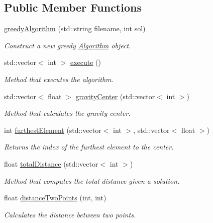 \subsection*{Public Member Functions}
\begin{DoxyCompactItemize}
\item 
\hyperlink{classgreedyAlgorithm_ad2ec161ba440c1a8f35b26823e37ca6b}{greedy\+Algorithm} (std\+::string filename, int sol)
\begin{DoxyCompactList}\small\item\em Construct a new greedy \hyperlink{classAlgorithm}{Algorithm} object. \end{DoxyCompactList}\item 
std\+::vector$<$ int $>$ \hyperlink{classgreedyAlgorithm_a37c81600b24a32ae25b6f0eeab643a7a}{execute} ()
\begin{DoxyCompactList}\small\item\em Method that executes the algorithm. \end{DoxyCompactList}\item 
std\+::vector$<$ float $>$ \hyperlink{classgreedyAlgorithm_a1ba2f9ae707c3d68f0af86ea320f80cf}{gravity\+Center} (std\+::vector$<$ int $>$)
\begin{DoxyCompactList}\small\item\em Method that calculates the gravity center. \end{DoxyCompactList}\item 
int \hyperlink{classgreedyAlgorithm_afb8dddb24fefb88da82011db8c07e17c}{furthest\+Element} (std\+::vector$<$ int $>$, std\+::vector$<$ float $>$)
\begin{DoxyCompactList}\small\item\em Returns the index of the furthest element to the center. \end{DoxyCompactList}\item 
float \hyperlink{classgreedyAlgorithm_a523e81ad05f34731d5259e712b0b6ee5}{total\+Distance} (std\+::vector$<$ int $>$)
\begin{DoxyCompactList}\small\item\em Method that computes the total distance given a solution. \end{DoxyCompactList}\item 
float \hyperlink{classgreedyAlgorithm_a59dd977d1c232276b8494de999e415d4}{distance\+Two\+Points} (int, int)
\begin{DoxyCompactList}\small\item\em Calculates the distance between two points. \end{DoxyCompactList}\end{DoxyCompactItemize}
